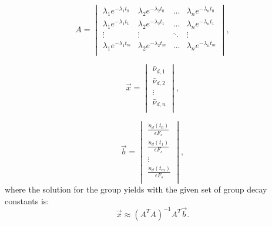 \documentclass{style/nseJournal}
\begin{document}
\begin{equation}
A = 
\begin{vmatrix}
\lambda_1 e^{-\lambda_1 t_0} & \lambda_2 e^{-\lambda_2 t_0} & \hdots &  \lambda_n e^{-\lambda_n t_0}\\
\lambda_1 e^{-\lambda_1 t_1} & \lambda_2 e^{-\lambda_2 t_1} & \hdots &  \lambda_n e^{-\lambda_n t_1}\\
\vdots                       & \vdots                       & \ddots &  \vdots                      \\
\lambda_1 e^{-\lambda_1 t_m} & \lambda_2 e^{-\lambda_2 t_m} &  \hdots  & \lambda_n e^{-\lambda_n t_m}\\
\end{vmatrix}
\label{eq:lambda},
\end{equation}

\begin{equation}
\vec{x} = 
\begin{vmatrix}
\bar{\nu}_{d,1}\\
\bar{\nu}_{d,2}\\
\vdots\\
\bar{\nu}_{d,n}\\
\end{vmatrix},
\end{equation}

\begin{equation}
\vec{b} = 
\begin{vmatrix}
\frac{\dot{n}_d(t_0)}{\epsilon F_s}\\
\frac{\dot{n}_d(t_1)}{\epsilon F_s}\\
\vdots\\
\frac{\dot{n}_d(t_m)}{\epsilon F_s}\\
\end{vmatrix},
\end{equation}
where the solution for the group yields with the given set of group decay constants is:
\begin{equation}
\vec{x} \approx (A^{T} A)^{-1} A^{T} \vec{b}
\label{eq:bvec}.
\end{equation}
\end{document}
